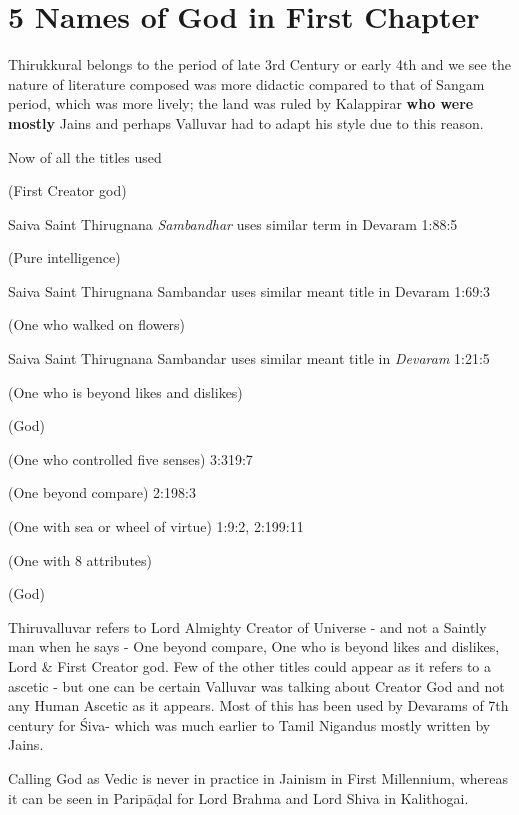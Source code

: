 \section*{5 Names of God in First Chapter}

Thirukkural belongs to the period of late 3rd Century or early 4th and we see the nature of literature composed was more didactic compared to that of Sangam period, which was more lively; the land was ruled by Kalappirar \textbf{who were mostly} Jains and perhaps Valluvar had to adapt his style due to this reason.

Now of all the titles used

 (First Creator god)

Saiva Saint Thirugnana \textit{Sambandhar} uses similar term in Devaram 1:88:5

 (Pure intelligence)

Saiva Saint Thirugnana Sambandar uses similar meant title in Devaram 1:69:3

 (One who walked on flowers)

Saiva Saint Thirugnana Sambandar uses similar meant title in \textit{Devaram} 1:21:5

 (One who is beyond likes and dislikes)

 (God)

 (One who controlled five senses) 3:319:7

 (One beyond compare) 2:198:3

 (One with sea or wheel of virtue) 1:9:2, 2:199:11

 (One with 8 attributes)

 (God)

Thiruvalluvar refers to Lord Almighty Creator of Universe - and not a Saintly man when he says - One beyond compare, One who is beyond likes and dislikes, Lord \& First Creator god. Few of the other titles could appear as it refers to a ascetic - but one can be certain Valluvar was talking about Creator God and not any Human Ascetic as it appears. Most of this has been used by Devarams of 7th century for Śiva- which was much earlier to Tamil Nigandus mostly written by Jains.

Calling God as Vedic is never in practice in Jainism in First Millennium, whereas it can be seen in Paripāḍal for Lord Brahma and Lord Shiva in Kalithogai.

